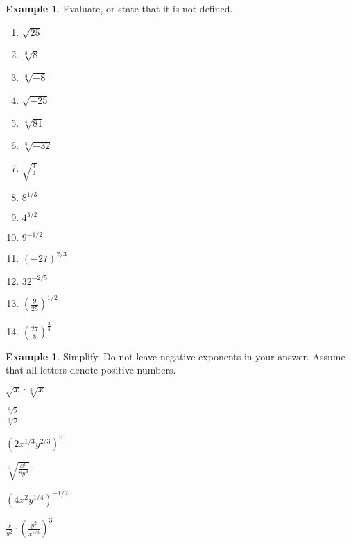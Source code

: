 \documentclass[letterpaper,12pt,oneside]{book}
\theoremstyle{definition}
\newtheorem{example}[theorem]{Example}
\begin{document}
\begin{example} Evaluate, or state that it is not defined.
\begin{multicols}{2}
\begin{enumerate}
\item $\sqrt{25}$
\vspace{0.1cm}
\item $\sqrt[3]{8}$
\vspace{0.1cm}
\item $\sqrt[3]{-8}$
\vspace{0.1cm}
\item $\sqrt{-25}$
\vspace{0.1cm}
\item $\sqrt[4]{81}$
\vspace{0.1cm}
\item $\sqrt[5]{-32}$
\vspace{0.1cm}
\item $\sqrt{\tfrac{1}{4}}$
\vspace{0.1cm}
\item $8^{1/3}$
\vspace{0.1cm}
\item $4^{3/2}$
\vspace{0.1cm}
\item $9^{-1/2}$
\vspace{0.1cm}
\item $(-27)^{2/3}$
\vspace{0.1cm}
\item $32^{-2/5}$
\vspace{0.1cm}
\item $\left(\tfrac{9}{25}\right)^{1/2}$
\vspace{0.1cm}
\item $\left(\tfrac{27}{8}\right)^{\frac{2}{3}}$
\vspace{0.1cm}
\end{enumerate}
\end{multicols}
\end{example}

\begin{example}
Simplify.  Do not leave negative exponents in your answer.  Assume that all letters denote positive numbers.
\begin{enumerate}
\begin{multicols*}{2}
\item $\sqrt{x}\cdot \sqrt[3]{x}$
\vfill\null
\item $\displaystyle\frac{\sqrt[6]{y}}{\sqrt[3]{y}}$
\vfill\null
\item $\displaystyle\left(2x^{1/3}y^{2/3}\right)^6$
\vfill\null
\columnbreak
\item $\displaystyle\sqrt[3]{\frac{x^6}{8y^9}}$
\vfill\null
\item $(4x^2y^{1/4})^{-1/2}$
\vfill\null
\item $\displaystyle\frac{x}{y^2}\cdot \left(\frac{y^2}{x^{1/3}}\right)^3$
\vfill\null
\end{multicols*}
\end{enumerate}
\end{example}
\end{document}

